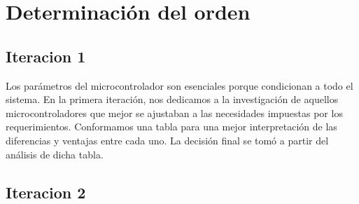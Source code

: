 
\section{Determinación del orden} %
\label{it0:sec:determinacion_del_orden}

\subsection{Iteracion 1} %
\label{sub:iteracion_1}

Los parámetros del microcontrolador son esenciales porque condicionan a todo el sistema. En la primera iteración, nos dedicamos a la investigación de aquellos microcontroladores que mejor se ajustaban a las necesidades impuestas por los requerimientos. Conformamos una tabla para una mejor interpretación de las diferencias y ventajas entre cada uno. La decisión final se tomó a partir del análisis de dicha tabla.



\subsection{Iteracion 2} %
\label{sub:iteracion_2}


